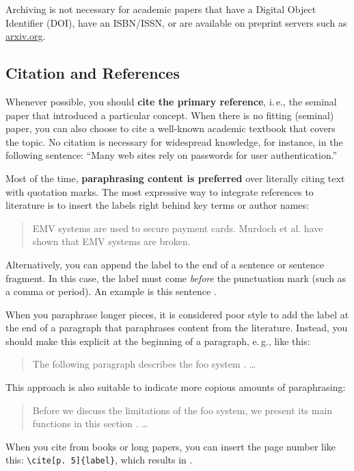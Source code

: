 Archiving is not necessary for academic papers that have a Digital Object Identifier (DOI), have an ISBN/ISSN, or are available on preprint servers such as \url{arxiv.org}.


\subsection{Citation and References}

Whenever possible, you should \textbf{cite the primary reference},
i.\,e., the seminal paper that introduced a particular concept. When there is no fitting (seminal) paper, you can also choose to cite a well-known academic textbook that covers the topic. No citation is necessary for widespread knowledge, for instance, in the following sentence: ``Many web sites rely on passwords for user authentication.''

Most of the time, \textbf{paraphrasing content is preferred} over literally citing text with quotation marks. The most expressive way to integrate references to literature is to insert the labels right behind key terms or author names:
\begin{quote}
  EMV systems \cite{anderson_ross_emv:_2014} are used to secure payment cards. Murdoch et al. \cite{murdoch_steven_j._chip_2010} have shown that EMV systems are broken.
\end{quote}

Alternatively, you can append the label to the end of a sentence or sentence fragment. In this case, the label must come \emph{before} the punctuation mark (such as a comma or period). An example is this sentence \cite{Hintz02}.

When you paraphrase longer pieces, it is considered poor style to add the label at the end of a paragraph that paraphrases content from the literature. Instead, you should make this explicit at the beginning of a paragraph, e.\,g., like this:
\begin{quote}
  The following paragraph describes the foo system \cite{kou_weidong_secure_2003}. …
\end{quote}

This approach is also suitable to indicate more copious amounts of paraphrasing:
\begin{quote}
  Before we discuss the limitations of the foo system, we present its main functions in this section \cite{kou_weidong_secure_2003}. …
\end{quote}

When you cite from books or long papers, you can insert the page number like this: \verb|\cite[p. 5]{label}|, which results in \cite[p. 5]{kou_weidong_secure_2003}.

